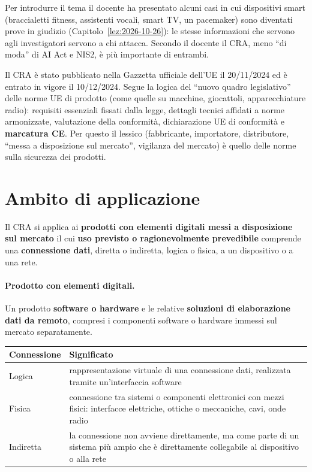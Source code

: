 Per introdurre il tema il docente ha presentato alcuni casi in cui dispositivi smart (braccialetti
fitness, assistenti vocali, smart TV, un pacemaker) sono diventati prove in giudizio
(Capitolo~\ref{lez:2026-10-26}): le stesse informazioni che servono agli investigatori servono a chi
attacca. Secondo il docente il CRA, meno ``di moda'' di AI Act e NIS2, è più importante di entrambi.

\begin{integrazione}
Il CRA è stato pubblicato nella Gazzetta ufficiale dell'UE il 20/11/2024 ed è entrato in vigore il
10/12/2024. Segue la logica del ``nuovo quadro legislativo'' delle norme UE di prodotto (come quelle su
macchine, giocattoli, apparecchiature radio): requisiti essenziali fissati dalla legge, dettagli tecnici
affidati a norme armonizzate, valutazione della conformità, dichiarazione UE di conformità e
\textbf{marcatura CE}. Per questo il lessico (fabbricante, importatore, distributore, ``messa a
disposizione sul mercato'', vigilanza del mercato) è quello delle norme sulla sicurezza dei prodotti.
\end{integrazione}

\section{Ambito di applicazione}
\label{sec:cra-ambito}

Il CRA si applica ai \textbf{prodotti con elementi digitali messi a disposizione sul mercato} il cui
\textbf{uso previsto o ragionevolmente prevedibile} comprende una \textbf{connessione dati}, diretta o
indiretta, logica o fisica, a un dispositivo o a una rete.

\paragraph{Prodotto con elementi digitali.} Un prodotto \textbf{software o hardware} e le relative
\textbf{soluzioni di elaborazione dati da remoto}, compresi i componenti software o hardware immessi sul
mercato separatamente.

\begin{center}
\small
\begin{tabularx}{\linewidth}{>{\raggedright\arraybackslash}p{2.6cm} X}
\toprule
\textbf{Connessione} & \textbf{Significato}\\
\midrule
Logica & rappresentazione virtuale di una connessione dati, realizzata tramite un'interfaccia software\\
Fisica & connessione tra sistemi o componenti elettronici con mezzi fisici: interfacce elettriche, ottiche
  o meccaniche, cavi, onde radio\\
Indiretta & la connessione non avviene direttamente, ma come parte di un sistema più ampio che è
  direttamente collegabile al dispositivo o alla rete\\
\bottomrule
\end{tabularx}
\end{center}


